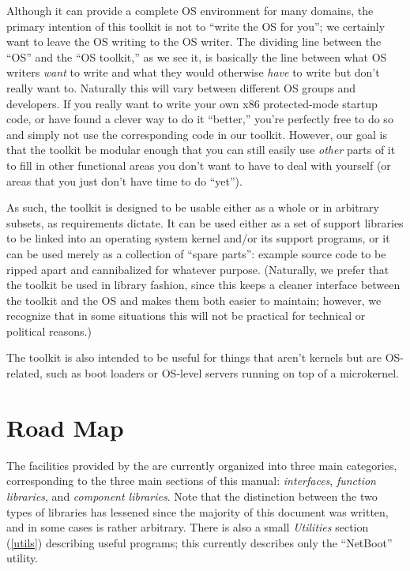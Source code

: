 Although it can provide a complete OS environment for many domains,
the primary intention of this toolkit is not to ``write the OS for you'';
we certainly want to leave the OS writing to the OS writer.
The dividing line between the ``OS'' and the ``OS toolkit,'' as we see it,
is basically the line between what OS writers \emph{want} to write
and what they would otherwise \emph{have} to write but don't really want to.
Naturally this will vary between different OS groups and developers.
If you really want to write your own x86 protected-mode startup code,
or have found a clever way to do it ``better,''
you're perfectly free to do so
and simply not use the corresponding code in our toolkit.
However, our goal is that the toolkit be modular enough
that you can still easily use \emph{other} parts of it
to fill in other functional areas you don't want to have to deal with yourself
(or areas that you just don't have time to do ``yet'').

As such, the toolkit is designed to be usable either as a whole
or in arbitrary subsets, as requirements dictate.
It can be used either as a set of support libraries
to be linked into an operating system kernel and/or its support programs,
or it can be used merely as a collection of ``spare parts'':
example source code to be ripped apart and cannibalized for whatever purpose.
(Naturally, we prefer that the toolkit be used in library fashion,
since this keeps a cleaner interface between the toolkit and the OS
and makes them both easier to maintain;
however, we recognize that in some situations this will not be practical
for technical or political reasons.)

The toolkit is also intended to be useful for things that aren't kernels
but are OS-related, such as boot loaders
or OS-level servers running on top of a microkernel.

\section{Road Map}

The facilities provided by the \oskit{}
are currently organized into three main categories,
corresponding to the three main sections of this manual:
\emph{interfaces}, \emph{function libraries}, and \emph{component libraries}.
Note that the distinction between the two types of libraries has
lessened since the majority of this document was written, and in some
cases is rather arbitrary.
There is also a small \emph{Utilities} section (\ref{utils}) describing
useful \oskit{} programs; this currently describes only
the ``NetBoot'' utility.

